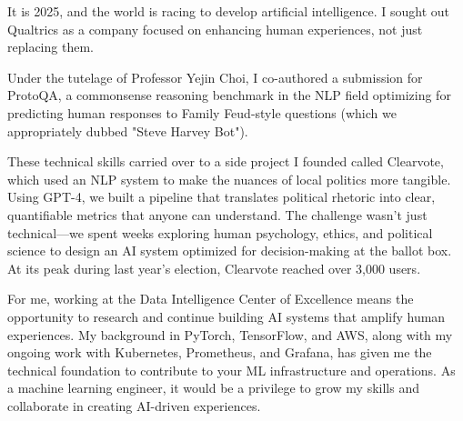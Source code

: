 It is 2025, and the world is racing to develop artificial intelligence. I sought out Qualtrics as a company focused on enhancing human experiences, not just replacing them.

Under the tutelage of Professor Yejin Choi, I co-authored a submission for ProtoQA, a commonsense reasoning benchmark in the NLP field optimizing for predicting human responses to Family Feud-style questions (which we appropriately dubbed "Steve Harvey Bot").

These technical skills carried over to a side project I founded called Clearvote, which used an NLP system to make the nuances of local politics more tangible. Using GPT-4, we built a pipeline that translates political rhetoric into clear, quantifiable metrics that anyone can understand. The challenge wasn't just technical—we spent weeks exploring human psychology, ethics, and political science to design an AI system optimized for decision-making at the ballot box. At its peak during last year’s election, Clearvote reached over 3,000 users.

For me, working at the Data Intelligence Center of Excellence means the opportunity to research and continue building AI systems that amplify human experiences. My background in PyTorch, TensorFlow, and AWS, along with my ongoing work with Kubernetes, Prometheus, and Grafana, has given me the technical foundation to contribute to your ML infrastructure and operations. As a machine learning engineer, it would be a privilege to grow my skills and collaborate in creating AI-driven experiences.